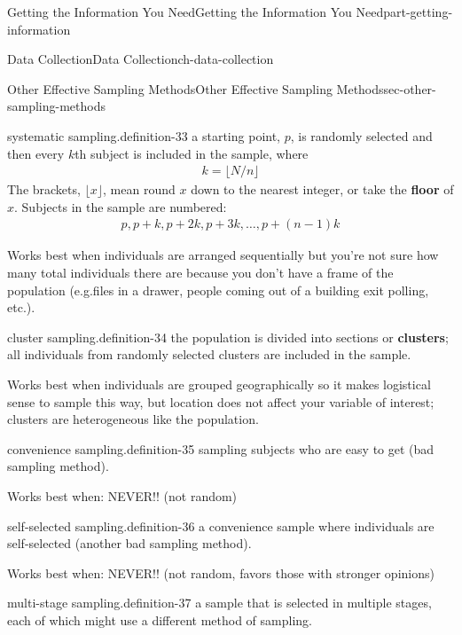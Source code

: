 \documentclass[oneside,10pt,]{book}
\newcommand{\terminology}[1]{\textbf{#1}}
\numberwithin{equation}{section}
\begin{document}
\begin{partptx}{Getting the Information You Need}{}{Getting the Information You Need}{}{}{part-getting-information}
\begin{chapterptx}{Data Collection}{}{Data Collection}{}{}{ch-data-collection}
\begin{sectionptx}{Other Effective Sampling Methods}{}{Other Effective Sampling Methods}{}{}{sec-other-sampling-methods}
\begin{definition}{systematic sampling.}{definition-33}%
\hypertarget{p-20}{}%
a starting point, \(p\), is randomly selected and then every \(k\)th subject is included in the sample, where%
\begin{gather*}
k = \lfloor N/n \rfloor
\end{gather*}
The brackets, \(\lfloor x \rfloor\), mean round \(x\) down to the nearest integer, or take the \terminology{floor} of \(x\). Subjects in the sample are numbered:%
\begin{gather*}
p, p+k, p+2k, p+3k, \ldots, p+(n-1)k
\end{gather*}
%
\par
\hypertarget{p-21}{}%
Works best when individuals are arranged sequentially but you’re not sure how many total individuals there are because you don’t have a frame of the population (e.g.\@ files in a drawer, people coming out of a building exit polling, etc.\@).%
\end{definition}
\begin{definition}{cluster sampling.}{definition-34}%
\hypertarget{p-22}{}%
the population is divided into sections or \terminology{clusters}; all individuals from randomly selected clusters are included in the sample.%
\par
\hypertarget{p-23}{}%
Works best when individuals are grouped geographically so it makes logistical sense to sample this way, but location does not affect your variable of interest; clusters are heterogeneous like the population.%
\end{definition}
\begin{definition}{convenience sampling.}{definition-35}%
\hypertarget{p-24}{}%
sampling subjects who are easy to get (bad sampling method).%
\par
\hypertarget{p-25}{}%
Works best when: NEVER!! (not random)%
\end{definition}
\begin{definition}{self-selected sampling.}{definition-36}%
\hypertarget{p-26}{}%
a convenience sample where individuals are self-selected (another bad sampling method).%
\par
\hypertarget{p-27}{}%
Works best when: NEVER!! (not random, favors those with stronger opinions)%
\end{definition}
\begin{definition}{multi-stage sampling.}{definition-37}%
\hypertarget{p-28}{}%
a sample that is selected in multiple stages, each of which might use a different method of sampling.%

\end{definition}
\end{sectionptx}
\end{chapterptx}
\end{partptx}
\end{document}
